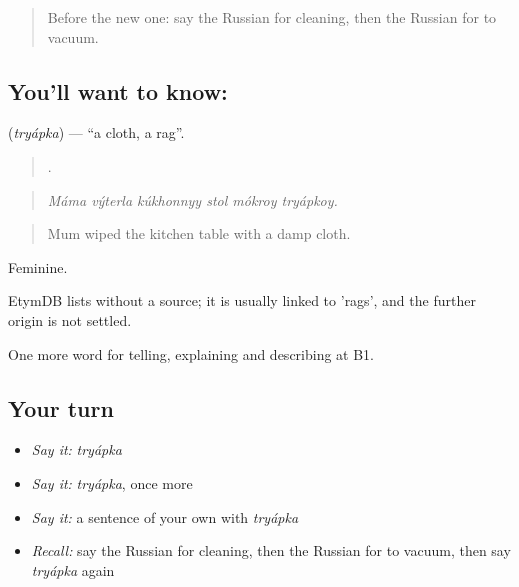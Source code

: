 \label{lesson:RU-C529-tryapka}



\begin{quote}
Before the new one: say the Russian for cleaning, then the Russian for to vacuum.
\end{quote}

\subsection*{You'll want to know: }
\textbf{} (\emph{tryápka}) — \textquotedblleft{}a cloth, a rag\textquotedblright{}.

\begin{quote}
     .
\end{quote}

\begin{quote}
\emph{Máma výterla kúkhonnyy stol mókroy tryápkoy.}
\end{quote}

\begin{quote}
Mum wiped the kitchen table with a damp cloth.
\end{quote}

Feminine.

\begin{cousinweb}
EtymDB lists \emph{} without a source; it is usually linked to \emph{} 'rags', and the further origin is not settled.
\end{cousinweb}

\begin{grammarlens}[title={What you've built}]
One more word for telling, explaining and describing at B1.
\end{grammarlens}

\subsection*{Your turn}
\begin{itemize}
\raggedright
  \item \emph{Say it:} \emph{tryápka}
  \item \emph{Say it:} \emph{tryápka}, once more
  \item \emph{Say it:} a sentence of your own with \emph{tryápka}
  \item \emph{Recall:} say the Russian for cleaning, then the Russian for to vacuum, then say \emph{tryápka} again
\end{itemize}

